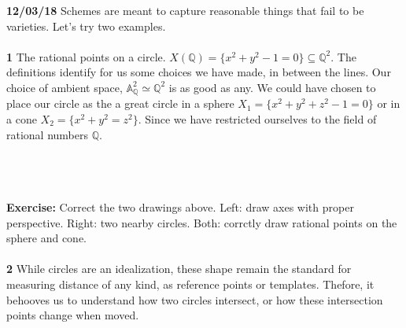 \documentclass[12pt]{article}
\begin{document}
\noindent \textbf{12/03/18} Schemes are meant to capture reasonable things that fail to be varieties.  Let's try two examples.  \\ \\
\textbf{1} The rational points on a circle.  $X(\mathbb{Q}) = \{ x^2 + y^2 - 1 = 0 \} \subseteq \mathbb{Q}^2$.  The definitions identify for us some choices we have made, in between the lines.  Our choice of ambient space, $\mathbb{A}_\mathbb{Q}^2 \simeq \mathbb{Q}^2$ is as good as any.  We could have chosen to place our circle as the a great circle in a sphere $X_1 = \{ x^2 + y^2 + z^2 - 1 = 0\}$ or in a cone $X_2 = \{ x^2 + y^2 = z^2 \}$.  Since we have restricted ourselves to the field of rational numbers $\mathbb{Q}$.  \\ \\
\\ \\
\textbf{Exercise:} Correct the two drawings above. Left: draw axes with proper perspective. Right: two nearby circles. Both: corrctly draw rational points on the sphere and cone.\\ \\
\textbf{2} While circles are an idealization, these shape remain the standard for measuring distance of any kind, as reference points or templates.  Thefore, it behooves us to understand how two circles intersect, or how these intersection points change when moved. \\
 \\
\end{document}
